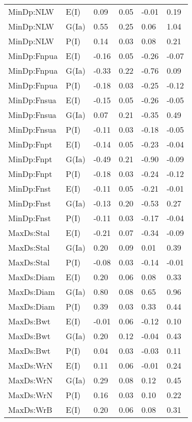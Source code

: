 \begin{center}
\begin{longtable}{|p{1.1in}|p{0.7in}|p{0.7in}|p{0.6in}|p{0.6in}|p{0.6in}|}
  MinDp:NLW & E(I) & 0.09 & 0.05 & -0.01 & 0.19 \\ 
  MinDp:NLW & G(Ia) & 0.55 & 0.25 & 0.06 & 1.04 \\ 
  MinDp:NLW & P(I) & 0.14 & 0.03 & 0.08 & 0.21 \\ 
  MinDp:Fnpua & E(I) & -0.16 & 0.05 & -0.26 & -0.07 \\ 
  MinDp:Fnpua & G(Ia) & -0.33 & 0.22 & -0.76 & 0.09 \\ 
  MinDp:Fnpua & P(I) & -0.18 & 0.03 & -0.25 & -0.12 \\ 
  MinDp:Fnsua & E(I) & -0.15 & 0.05 & -0.26 & -0.05 \\ 
  MinDp:Fnsua & G(Ia) & 0.07 & 0.21 & -0.35 & 0.49 \\ 
  MinDp:Fnsua & P(I) & -0.11 & 0.03 & -0.18 & -0.05 \\ 
  MinDp:Fnpt & E(I) & -0.14 & 0.05 & -0.23 & -0.04 \\ 
  MinDp:Fnpt & G(Ia) & -0.49 & 0.21 & -0.90 & -0.09 \\ 
  MinDp:Fnpt & P(I) & -0.18 & 0.03 & -0.24 & -0.12 \\ 
  MinDp:Fnst & E(I) & -0.11 & 0.05 & -0.21 & -0.01 \\ 
  MinDp:Fnst & G(Ia) & -0.13 & 0.20 & -0.53 & 0.27 \\ 
  MinDp:Fnst & P(I) & -0.11 & 0.03 & -0.17 & -0.04 \\ 
  MaxDs:Stal & E(I) & -0.21 & 0.07 & -0.34 & -0.09 \\ 
  MaxDs:Stal & G(Ia) & 0.20 & 0.09 & 0.01 & 0.39 \\ 
  MaxDs:Stal & P(I) & -0.08 & 0.03 & -0.14 & -0.01 \\ 
  MaxDs:Diam & E(I) & 0.20 & 0.06 & 0.08 & 0.33 \\ 
  MaxDs:Diam & G(Ia) & 0.80 & 0.08 & 0.65 & 0.96 \\ 
  MaxDs:Diam & P(I) & 0.39 & 0.03 & 0.33 & 0.44 \\ 
  MaxDs:Bwt & E(I) & -0.01 & 0.06 & -0.12 & 0.10 \\ 
  MaxDs:Bwt & G(Ia) & 0.20 & 0.12 & -0.04 & 0.43 \\ 
  MaxDs:Bwt & P(I) & 0.04 & 0.03 & -0.03 & 0.11 \\ 
  MaxDs:WrN & E(I) & 0.11 & 0.06 & -0.01 & 0.24 \\ 
  MaxDs:WrN & G(Ia) & 0.29 & 0.08 & 0.12 & 0.45 \\ 
  MaxDs:WrN & P(I) & 0.16 & 0.03 & 0.10 & 0.22 \\ 
  MaxDs:WrB & E(I) & 0.20 & 0.06 & 0.08 & 0.31 \\ 

\end{longtable}
\end{center}
